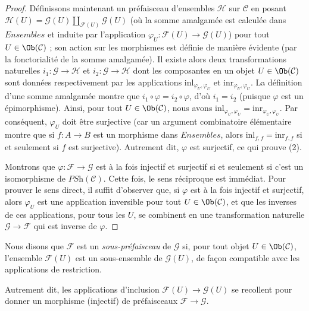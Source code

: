 \begin{proof}
\medskip\noindent
Définissons maintenant un préfaisceau d’ensembles $\mathcal{H}$ sur $\mathcal{C}$
en posant $\mathcal{H}(U)
= \mathcal{G}(U) \coprod_{\mathcal{F}(U)} \mathcal{G}(U)$ (où
la somme amalgamée est calculée dans $\textit{Ensembles}$ et induite par
l’application $\varphi_U : \mathcal{F}(U) \to \mathcal{G}(U)$) pour
tout $U \in \Ob(\mathcal{C})$ ; son action sur les morphismes est
définie de manière évidente (par la fonctorialité de la somme amalgamée).
Il existe alors deux transformations
naturelles $i_1 : \mathcal{G} \to \mathcal{H}$ et
$i_2 : \mathcal{G} \to \mathcal{H}$ dont les composantes en un objet
$U \in \Ob(\mathcal{C})$ sont données respectivement par les applications
$\text{inl}_{\varphi_U, \varphi_U}$ et
$\text{inr}_{\varphi_U, \varphi_U}$. La
définition d’une somme amalgamée montre que $i_1 \circ \varphi
= i_2 \circ \varphi$, d’où $i_1 = i_2$ (puisque $\varphi$ est un
épimorphisme). Ainsi, pour tout $U \in \Ob(\mathcal{C})$, nous avons
$\text{inl}_{\varphi_U, \varphi_U}
= \text{inr}_{\varphi_U, \varphi_U}$. Par conséquent, $\varphi_U$
doit être surjective (car un argument combinatoire élémentaire montre
que si $f : A \to B$ est un morphisme dans $\textit{Ensembles}$, alors
$\text{inl}_{f,f} = \text{inr}_{f,f}$ si et
seulement si $f$ est surjective). Autrement dit, $\varphi$ est
surjectif, ce qui prouve (2).

\medskip\noindent
Montrons que $\varphi : \mathcal{F} \to
\mathcal{G}$ est à la fois injectif et surjectif si et seulement si c’est
un isomorphisme de $\textit{PSh}(\mathcal{C})$. Cette fois,
le sens réciproque est immédiat. Pour prouver le sens direct,
il suffit d’observer que, si $\varphi$ est à la fois
injectif et surjectif, alors $\varphi_U$ est une application inversible
pour tout $U \in \Ob(\mathcal{C})$, et que les inverses de ces
applications, pour tous les $U$, se combinent en une transformation naturelle
$\mathcal{G} \to \mathcal{F}$ qui est inverse de $\varphi$.
\end{proof}

\begin{definition}
\label{definition-sub-presheaf}
Nous disons que $\mathcal{F}$ est un {\it sous-préfaisceau} de $\mathcal{G}$
si, pour tout objet $U \in \Ob(\mathcal{C})$, l’ensemble
$\mathcal{F}(U)$ est un sous-ensemble de $\mathcal{G}(U)$, de façon compatible
avec les applications de restriction.
\end{definition}

\noindent
Autrement dit, les applications
d’inclusion $\mathcal{F}(U) \to \mathcal{G}(U)$
se recollent pour donner un morphisme (injectif) de
préfaisceaux $\mathcal{F} \to \mathcal{G}$.

